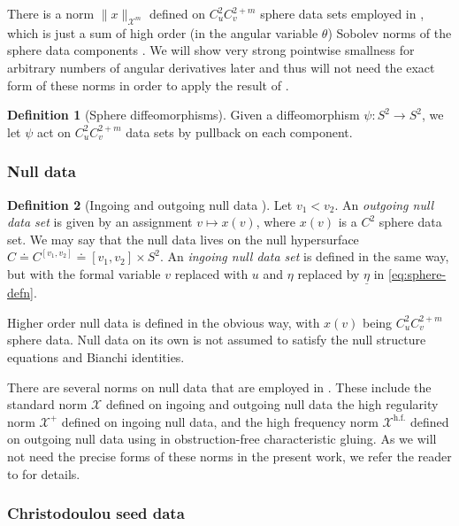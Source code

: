 \documentclass[10pt]{article}
\numberwithin{equation}{section}
\theoremstyle{plain}
\theoremstyle{definition}
\newtheorem{defn}{Definition}[section]
\begin{document}
There is a norm $\|x\|_{\mathcal X^m}$ defined on $C^{2}_uC^{2+m}_{v}$ sphere data sets employed in \cite{ACR2, Czimek2022-cl}, which is just a sum of high order (in the angular variable $\theta$) Sobolev norms of the sphere data components \cite[Definition 2.5]{ACR2}. We will show very strong pointwise smallness for arbitrary numbers of angular derivatives later and thus will not need the exact form of these norms in order to apply the result of \cite{Czimek2022-cl}. 

\begin{defn}[Sphere diffeomorphisms]\label{def:sphere-diffeo}
    Given a diffeomorphism $\psi:S^2\to S^2$, we let $\psi$ act on $C^2_uC^{2+m}_v$ data sets by pullback on each component. 
\end{defn}

\subsubsection{Null data}

\begin{defn}[Ingoing and outgoing null data {\cite[Definition 2.6]{ACR2}}]
Let $v_1<v_2$. An \emph{outgoing null data set} is given by an assignment $v\mapsto x(v)$, where $x(v)$ is a $C^2$ sphere data set. We may say that the null data lives on the null hypersurface $C\doteq C^{[v_1,v_2]}\doteq [v_1,v_2]\times S^2$. An \emph{ingoing null data set} is defined in the same way, but with the formal variable $v$ replaced with $u$ and $\eta$ replaced by $\underline\eta$ in \eqref{eq:sphere-defn}. 

Higher order null data is defined in the obvious way, with $x(v)$ being $C^2_uC^{2+m}_{v}$ sphere data. Null data on its own is not assumed to satisfy the null structure equations and Bianchi identities. 
\end{defn}

There are several norms on null data that are employed in \cite{ACR1,ACR2,ACR3,Czimek2022-cl}. These include the standard norm $\mathcal X$ defined on ingoing and outgoing null data the high regularity norm $\mathcal X^+$ defined on ingoing null data, and the high frequency norm $\mathcal X^{\text{h.f.}}$ defined on outgoing null data using in obstruction-free characteristic gluing. As we will not need the precise forms of these norms in the present work, we refer the reader to \cite[Definition 2.7]{ACR2} for details. 

\subsubsection{Christodoulou seed data}\label{sec:Chr-seed-data}
\end{document}
